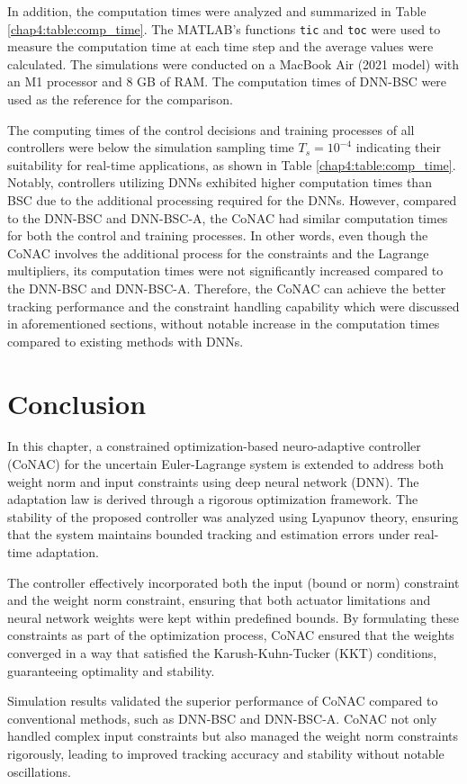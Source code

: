 In addition, the computation times were analyzed and summarized in Table \ref{chap4:table:comp_time}.
The MATLAB's functions \texttt{tic} and \texttt{toc} were used to measure the computation time at each time step and the average values were calculated.
The simulations were conducted on a MacBook Air (2021 model) with an M1 processor and 8 GB of RAM.
The computation times of DNN-BSC were used as the reference for the comparison.

The computing times of the control decisions and training processes of all controllers were below the simulation sampling time $T_s=10^{-4}$ indicating their suitability for real-time applications, as shown in Table \ref{chap4:table:comp_time}.
Notably, controllers utilizing DNNs exhibited higher computation times than BSC due to the additional processing required for the DNNs.
However, compared to the DNN-BSC and DNN-BSC-A, the CoNAC had similar computation times for both the control and training processes.
In other words, even though the CoNAC involves the additional process for the constraints and the Lagrange multipliers, its computation times were not significantly increased compared to the DNN-BSC and DNN-BSC-A.
Therefore, the CoNAC can achieve the better tracking performance and the constraint handling capability which were discussed in aforementioned sections, without notable increase in the computation times compared to existing methods with DNNs.  

\section{Conclusion} 

In this chapter, a constrained optimization-based neuro-adaptive controller (CoN\allowbreak AC) for the uncertain Euler-Lagrange system is extended to address both weight norm and input constraints using deep neural network (DNN).
The adaptation law is derived through a rigorous optimization framework. 
The stability of the proposed controller was analyzed using Lyapunov theory, ensuring that the system maintains bounded tracking and estimation errors under real-time adaptation.

The controller effectively incorporated both the input (bound or norm) constraint and the weight norm constraint, ensuring that both actuator limitations and neural network weights were kept within predefined bounds. 
By formulating these constraints as part of the optimization process, CoNAC ensured that the weights converged in a way that satisfied the Karush-Kuhn-Tucker (KKT) conditions, guaranteeing optimality and stability.

Simulation results validated the superior performance of CoNAC compared to conventional methods, such as DNN-BSC and DNN-BSC-A. 
CoNAC not only handled complex input constraints but also managed the weight norm constraints rigorously, leading to improved tracking accuracy and stability without notable oscillations.
